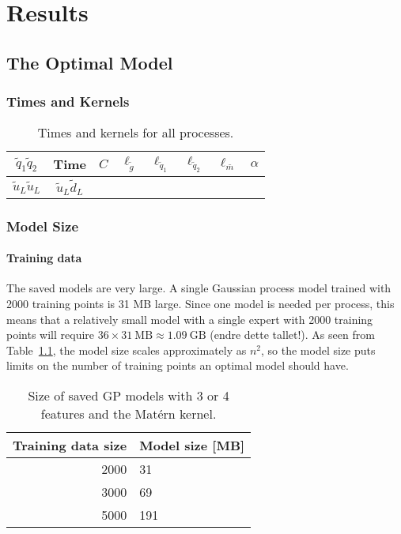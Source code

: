 \documentclass[twoside,english]{uiofysmaster}
\begin{document}
\tableofcontents

\chapter{Results}

\section{The Optimal Model}

\subsection{Times and Kernels}

\begin{table}
\centering
\begin{tabular}{c|c|c|c|c|c|c|c}
$\tilde{q}_1 \tilde{q}_2$ & Time & $C$ & $\ell_{\tilde{g}}$ & $\ell_{\tilde{q}_1}$ & $\ell_{\tilde{q}_2}$ & $\ell_{\bar{m}}$ & $\alpha$\\
\hline
$\tilde{u}_L \tilde{u}_L$ & 
$\tilde{u}_L \tilde{d}_L$ & 
\end{tabular}
\caption{Times and kernels for all processes.}
\end{table}

\subsection{Model Size}
\subsubsection{Training data}

The saved models are very large. A single Gaussian process model trained with 2000 training points is 31 MB large. Since one model is needed per process, this means that a relatively small model with a single expert with 2000 training points will require $36 \times 31~ \text{MB} \approx 1.09~\text{GB}$ (endre dette tallet!). As seen from Table~\ref{Tab:: results : model size vs training points}, the model size scales approximately as $n^2$, so the model size puts limits on the number of training points an optimal model should have.

\begin{table}
\centering
\begin{tabular}{r|l}
Training data size & Model size [MB]\\
\hline
2000 & 31\\
3000 & 69\\
5000 & 191\\
\end{tabular}
\caption{Size of saved GP models with 3 or 4 features and the Mat\'{e}rn kernel.}
\label{Tab:: results : model size vs training points}
\end{table}
\end{document}
